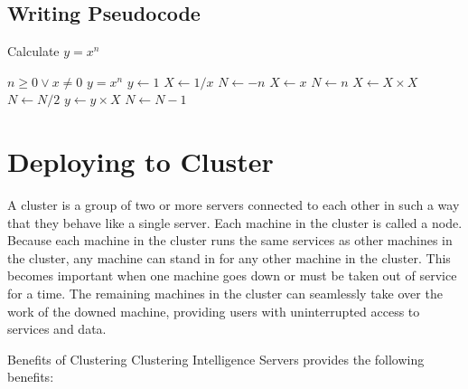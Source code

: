 \documentclass[12pt]{article}
\begin{document}
\begin{itemize}
\begin{figure}[!h]
\end{figure}


\end{itemize}

\newpage
\clearpage%
\thispagestyle{empty}%
\subsection{Writing Pseudocode}
\begin{algorithm}
\caption{Calculate $y = x^n$}
\begin{algorithmic}
\REQUIRE $n \geq 0 \vee x \neq 0$
\ENSURE $y = x^n$
\STATE $y \leftarrow 1$
\STATE $X \leftarrow 1 / x$
\STATE $N \leftarrow -n$
\ELSE
\STATE $X \leftarrow x$
\STATE $N \leftarrow n$
\ENDIF
{}
\STATE $X \leftarrow X \times X$
\STATE $N \leftarrow N / 2$
\ELSE[$N$ is odd]
\STATE $y \leftarrow y \times X$
\STATE $N \leftarrow N - 1$
\ENDIF
\ENDWHILE
\end{algorithmic}
\end{algorithm}


\newpage
\section{Deploying to Cluster}
A cluster is a group of two or more servers connected to each other in such a way that they behave like a single server. Each machine in the cluster is called a node. Because each machine in the cluster runs the same services as other machines in the cluster, any machine can stand in for any other machine in the cluster. This becomes important when one machine goes down or must be taken out of service for a time. The remaining machines in the cluster can seamlessly take over the work of the downed machine, providing users with uninterrupted access to services and data.

Benefits of Clustering
Clustering Intelligence Servers provides the following benefits:
\end{document}
